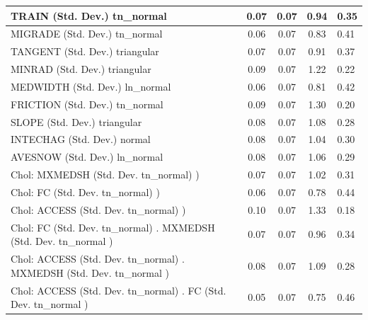 \begin{table}
\begin{center}
\begin{tabular}{|l|l|c|c|c|l|}
			\hline
			TRAIN (Std. Dev.) tn_normal &  & 0.07 & 0.07 & 0.94 & 0.35 \\
			\hline
			MIGRADE (Std. Dev.) tn_normal &  & 0.06 & 0.07 & 0.83 & 0.41 \\
			\hline
			TANGENT (Std. Dev.) triangular &  & 0.07 & 0.07 & 0.91 & 0.37 \\
			\hline
			MINRAD (Std. Dev.) triangular &  & 0.09 & 0.07 & 1.22 & 0.22 \\
			\hline
			MEDWIDTH (Std. Dev.) ln_normal &  & 0.06 & 0.07 & 0.81 & 0.42 \\
			\hline
			FRICTION (Std. Dev.) tn_normal &  & 0.09 & 0.07 & 1.30 & 0.20 \\
			\hline
			SLOPE (Std. Dev.) triangular &  & 0.08 & 0.07 & 1.08 & 0.28 \\
			\hline
			INTECHAG (Std. Dev.) normal &  & 0.08 & 0.07 & 1.04 & 0.30 \\
			\hline
			AVESNOW (Std. Dev.) ln_normal &  & 0.08 & 0.07 & 1.06 & 0.29 \\
			\hline
			 Chol: MXMEDSH (Std. Dev. tn_normal) ) &  & 0.07 & 0.07 & 1.02 & 0.31 \\
			\hline
			 Chol: FC (Std. Dev. tn_normal) ) &  & 0.06 & 0.07 & 0.78 & 0.44 \\
			\hline
			 Chol: ACCESS (Std. Dev. tn_normal) ) &  & 0.10 & 0.07 & 1.33 & 0.18 \\
			\hline
			 Chol: FC (Std. Dev. tn_normal) . MXMEDSH (Std. Dev.   tn_normal ) &  & 0.07 & 0.07 & 0.96 & 0.34 \\
			\hline
			 Chol: ACCESS (Std. Dev. tn_normal) . MXMEDSH (Std. Dev.   tn_normal ) &  & 0.08 & 0.07 & 1.09 & 0.28 \\
			\hline
			 Chol: ACCESS (Std. Dev. tn_normal) . FC (Std. Dev.   tn_normal ) &  & 0.05 & 0.07 & 0.75 & 0.46 \\
			\hline
		\end{tabular}
	\end{center}
\end{table}